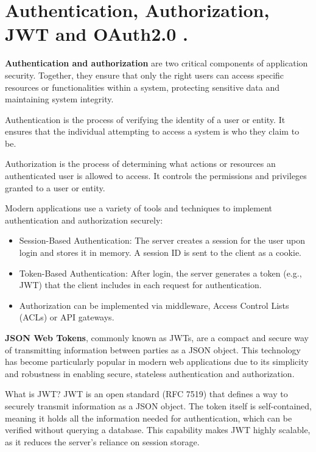 
\pagebreak

\chapter{Authentication, Authorization, JWT and OAuth2.0 .}


\medskip

\textbf{Authentication and authorization} are two critical components of application security. Together, they ensure that only the right users can access specific resources or functionalities within a system, protecting sensitive data and maintaining system integrity.

Authentication is the process of verifying the identity of a user or entity. It ensures that the individual attempting to access a system is who they claim to be.

Authorization is the process of determining what actions or resources an authenticated user is allowed to access. It controls the permissions and privileges granted to a user or entity.

Modern applications use a variety of tools and techniques to implement authentication and authorization securely:

\begin{itemize}
\item Session-Based Authentication: The server creates a session for the user upon login and stores it in memory. A session ID is sent to the client as a cookie.

\item Token-Based Authentication: After login, the server generates a token (e.g., JWT) that the client includes in each request for authentication.

\item Authorization can be implemented via middleware, Access Control Lists (ACLs) or API gateways.
\end{itemize}


\textbf{JSON Web Tokens}, commonly known as JWTs, are a compact and secure way of transmitting information between parties as a JSON object. This technology has become particularly popular in modern web applications due to its simplicity and robustness in enabling secure, stateless authentication and authorization.

What is JWT?
JWT is an open standard (RFC 7519) that defines a way to securely transmit information as a JSON object. The token itself is self-contained, meaning it holds all the information needed for authentication, which can be verified without querying a database. This capability makes JWT highly scalable, as it reduces the server's reliance on session storage.


